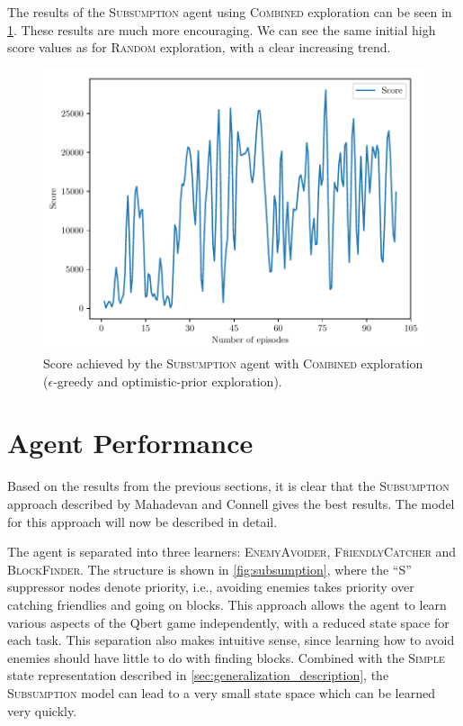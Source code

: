 \documentclass[a4paper,titlepage]{article}
\begin{document}
	The results of the \textsc{Subsumption} agent using \textsc{Combined} exploration can be seen in \cref{fig:subsumption_combined}. These results are much more encouraging. We can see the same initial high score values as for \textsc{Random} exploration, with a clear increasing trend.
	
	\begin{figure}[!htb]
		\centering
		\includegraphics[width=\columnwidth]{plots/subsumption_combined.pdf}
		\caption
		{Score achieved by the \textsc{Subsumption} agent with \textsc{Combined} exploration ($\epsilon$-greedy and optimistic-prior exploration).}
		\label{fig:subsumption_combined}
	\end{figure}
	
	
	\section{Agent Performance} \label{sec:performance}
	
	Based on the results from the previous sections, it is clear that the \textsc{Subsumption} approach described by Mahadevan and Connell \cite{mahadevan} gives the best results. The model for this approach will now be described in detail.
	
	The agent is separated into three learners: \textsc{EnemyAvoider}, \textsc{FriendlyCatcher} and \textsc{BlockFinder}. The structure is shown in \cref{fig:subsumption}, where the ``S'' suppressor nodes denote priority, i.e., avoiding enemies takes priority over catching friendlies and going on blocks. This approach allows the agent to learn various aspects of the Qbert game independently, with a reduced state space for each task. This separation also makes intuitive sense, since learning how to avoid enemies should have little to do with finding blocks. Combined with the \textsc{Simple} state representation described in \cref{sec:generalization_description}, the \textsc{Subsumption} model can lead to a very small state space which can be learned very quickly.
	
\end{document}
